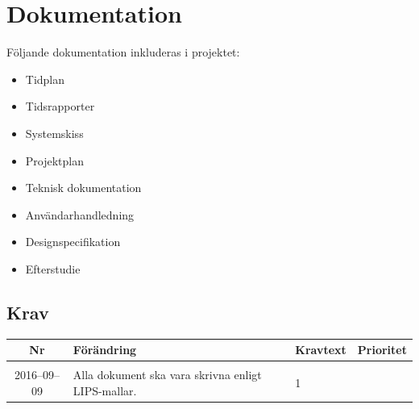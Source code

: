 \documentclass[a4paper,titlepage,12pt]{article}
\newcounter{reqNr}
\newcounter{reqNrII}
\newcommand{\nextReqNrII}{\stepcounter{reqNrII}\arabic{reqNrII}}
\newcommand{\newRequirement}[1] {\pbox{5cm}{Tillagt \\#1}}
\begin{document}
	\section{Dokumentation}
    Följande dokumentation inkluderas i projektet:
    \begin{itemize}
		\item Tidplan
        \item Tidsrapporter
		\item Systemskiss 
		\item Projektplan
		\item Teknisk dokumentation 
		\item Användarhandledning 
        \item Designspecifikation
        \item Efterstudie
    \end{itemize}

	\subsection{Krav}
	\begin{longtable}[c]{ c l>{\raggedright}p{} l }
		\textbf{Nr} & \textbf{Förändring} & \textbf{Kravtext} & \textbf{Prioritet} 
			\\ \midrule

		\nextReqNrII{} & \newRequirement{2016--09--09} & Alla dokument ska vara skrivna
		enligt LIPS-mallar. & 1
			\\ 

	\end{longtable}
\end{document}
